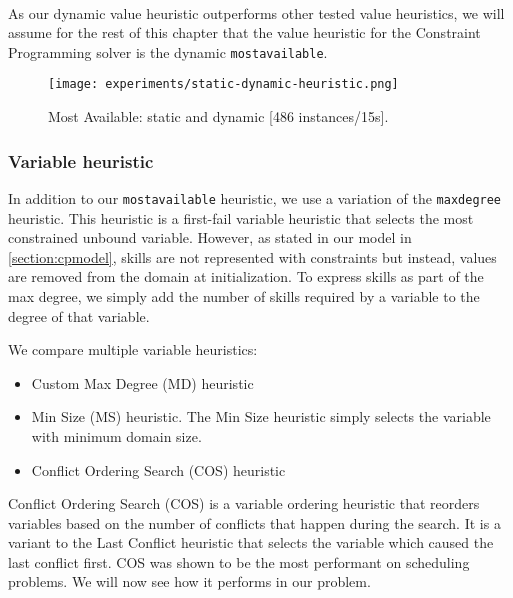 \documentclass[../../thesis.tex]{subfiles}
\begin{document}
\paragraph{}

As our dynamic value heuristic outperforms other tested value heuristics, we will assume for the rest of this chapter 
that the value heuristic for the Constraint Programming solver is the dynamic \texttt{mostavailable}.


\begin{figure}
  \centering
  \texttt{[image: experiments/static-dynamic-heuristic.png]}
  \caption{Most Available: static and dynamic [486 instances/15s].}
  \label{experiments:heuristic2}
\end{figure}


\subsubsection{Variable heuristic}

In addition to our \texttt{mostavailable} heuristic, we use a variation of the \texttt{maxdegree} heuristic. 
This heuristic is a first-fail variable heuristic that selects the most constrained unbound variable. However,
as stated in our model in \autoref{section:cpmodel}, skills are not represented with constraints but instead, values 
are removed from the domain at initialization. To express skills as part of the max degree, we simply add the number of 
skills required by a variable to the degree of that variable.


We compare multiple variable heuristics:

\begin{itemize}
  \item Custom Max Degree (MD) heuristic
  \item Min Size (MS) heuristic. The Min Size heuristic simply selects the variable with minimum domain size.
  \item Conflict Ordering Search (COS) heuristic
\end{itemize}


Conflict Ordering Search (COS) \cite{Gay:COS} is a variable ordering heuristic that 
reorders variables based on the number of conflicts that happen during the search.
It is a variant to the Last Conflict heuristic that selects the variable which caused the last conflict first.
COS was shown to be the most performant on scheduling problems. We will now see how it performs in our problem.
\end{document}
